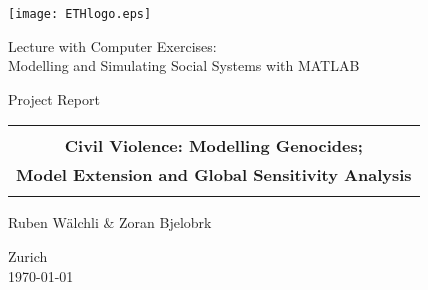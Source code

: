 
\thispagestyle{empty}

\begin{center}
\texttt{[image: ETHlogo.eps]}

\bigskip


\bigskip


\bigskip


\LARGE{ 	Lecture with Computer Exercises:\\ }
\LARGE{ Modelling and Simulating Social Systems with MATLAB\\}

\bigskip

\bigskip

\small{Project Report}\\

\bigskip

\bigskip

\bigskip

\bigskip


\begin{tabular}{|c|}
\hline
\\
\textbf{\LARGE{Civil Violence: Modelling Genocides;}}\\
\textbf{\LARGE{Model Extension and Global Sensitivity Analysis}}\\
\\
\hline
\end{tabular}
\bigskip

\bigskip

\bigskip

\LARGE{Ruben W\"alchli \& Zoran Bjelobrk}



\bigskip

\bigskip

\bigskip

\bigskip

\bigskip

\bigskip

\bigskip

\bigskip

Zurich\\
\today\\

\end{center}


